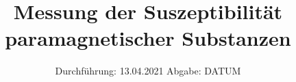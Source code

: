 

\subject{V606}
\title{Messung der Suszeptibilität paramagnetischer Substanzen}
\date{%
  Durchführung: 13.04.2021
  \hspace{3em}
  Abgabe: DATUM
}



\maketitle
\thispagestyle{empty}
\tableofcontents
\newpage






\printbibliography{}


